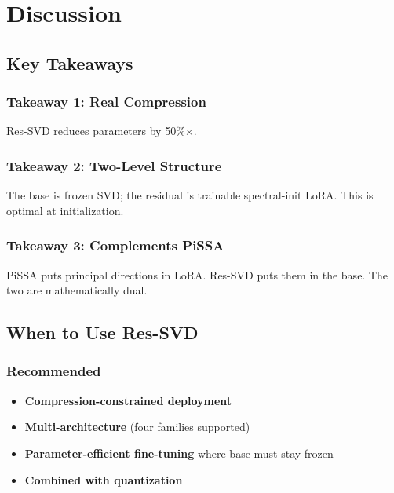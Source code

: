 \section{Discussion}

\subsection{Key Takeaways}

\subsubsection{Takeaway 1: Real Compression}

Res-SVD reduces parameters by 50\%$\times$.

\subsubsection{Takeaway 2: Two-Level Structure}

The base is frozen SVD; the residual is trainable spectral-init LoRA. 
This is optimal at initialization.

\subsubsection{Takeaway 3: Complements PiSSA}

PiSSA puts principal directions in LoRA. Res-SVD puts them in the base. 
The two are mathematically dual.

\subsection{When to Use Res-SVD}

\subsubsection{Recommended}

\begin{itemize}
\item \textbf{Compression-constrained deployment}
\item \textbf{Multi-architecture} (four families supported)
\item \textbf{Parameter-efficient fine-tuning} where base must stay frozen
\item \textbf{Combined with quantization}

\end{itemize}
